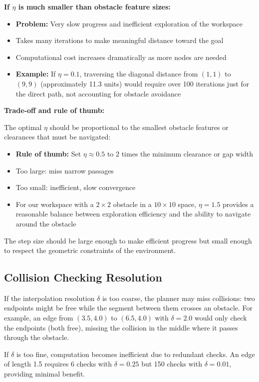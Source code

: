 \documentclass[11pt]{article}
\begin{document}
\textbf{If $\eta$ is much smaller than obstacle feature sizes:}
\begin{itemize}
    \item \textbf{Problem:} Very slow progress and inefficient exploration of the workspace
    \item Takes many iterations to make meaningful distance toward the goal
    \item Computational cost increases dramatically as more nodes are needed
    \item \textbf{Example:} If $\eta = 0.1$, traversing the diagonal distance from $(1,1)$ to $(9,9)$ (approximately 11.3 units) would require over 100 iterations just for the direct path, not accounting for obstacle avoidance
\end{itemize}

\textbf{Trade-off and rule of thumb:}

The optimal $\eta$ should be proportional to the smallest obstacle features or clearances that must be navigated:
\begin{itemize}
    \item \textbf{Rule of thumb:} Set $\eta \approx 0.5$ to $2$ times the minimum clearance or gap width
    \item Too large: miss narrow passages
    \item Too small: inefficient, slow convergence
    \item For our workspace with a $2 \times 2$ obstacle in a $10 \times 10$ space, $\eta = 1.5$ provides a reasonable balance between exploration efficiency and the ability to navigate around the obstacle
\end{itemize}

The step size should be large enough to make efficient progress but small enough to respect the geometric constraints of the environment.

\subsection{Collision Checking Resolution}

If the interpolation resolution $\delta$ is too coarse, the planner may miss collisions: two endpoints might be free while the segment between them crosses an obstacle. For example, an edge from $(3.5, 4.0)$ to $(6.5, 4.0)$ with $\delta = 2.0$ would only check the endpoints (both free), missing the collision in the middle where it passes through the obstacle.

If $\delta$ is too fine, computation becomes inefficient due to redundant checks. An edge of length 1.5 requires 6 checks with $\delta = 0.25$ but 150 checks with $\delta = 0.01$, providing minimal benefit.
\end{document}
